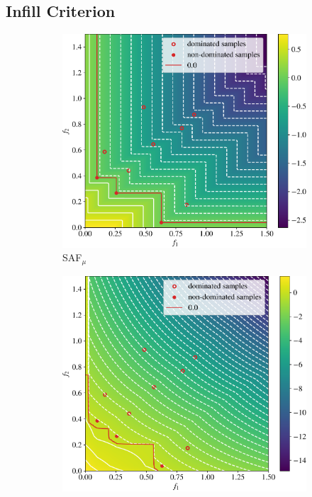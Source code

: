 \documentclass[conference]{IEEEtran}
\newcommand\safmu{SAF$_{\mu}$\xspace}
\begin{document}
\subsection{Infill Criterion}\label{section: infill_criterion}

\begin{figure}[t]
\begin{subfigure}[t]{0.48\columnwidth}
    \includegraphics[width=\columnwidth]{figures/_objective_space_SAF_mu.pdf}
    \caption{\safmu}
    \label{fig: saf_obj_space}
\end{subfigure}
\begin{subfigure}[t]{0.48\columnwidth}
    \includegraphics[width=\columnwidth]{figures/_objective_space_SMSEGO.pdf}

\end{subfigure}
\end{figure}
\end{document}
